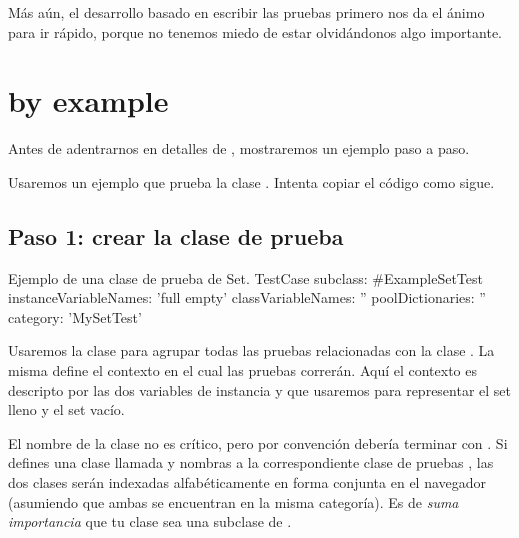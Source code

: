 \documentclass[a4paper,10pt,twoside]{book}
\begin{document}
M\'as a\'un, el desarrollo basado en escribir las pruebas primero nos da el \'animo para ir r\'apido, porque no tenemos miedo de estar olvid\'andonos algo importante.



\section{\sunit by example}

Antes de adentrarnos en detalles de \SUnit, mostraremos un ejemplo
paso a paso.

Usaremos un ejemplo que prueba la clase . Intenta copiar el c\'odigo como sigue.

\subsection{Paso 1: crear la clase de prueba}


\begin{classdef}[exampleSetTest]{Ejemplo de una clase de prueba de Set.}
TestCase subclass: #ExampleSetTest
	instanceVariableNames: 'full empty'
	classVariableNames: ''
	poolDictionaries: ''
	category: 'MySetTest'
\end{classdef}


Usaremos la clase  para agrupar todas las pruebas relacionadas con
la clase .  La misma define el contexto en el cual las pruebas
correr\'an. Aqu\'i el contexto es descripto por las dos variables de instancia  y 
que usaremos para representar el set lleno y el set vac\'io.

El nombre de la clase no es cr\'itico, pero por convenci\'on deber\'ia terminar con .
Si defines una clase llamada  y nombras a la correspondiente clase de pruebas ,
las dos clases ser\'an indexadas alfab\'eticamente en forma conjunta en el navegador (asumiendo
que ambas se encuentran en la misma categor\'ia).  Es de \emph{suma importancia} que tu clase 
sea una subclase de .
\end{document}
